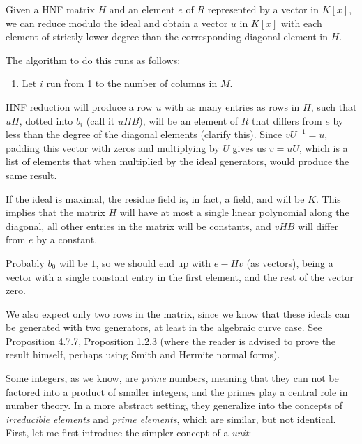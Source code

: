 Given a HNF matrix $H$ and an element $e$ of $R$ represented by a vector in $K[x]$, we can reduce modulo
the ideal and obtain a vector $u$ in $K[x]$ with each element of strictly lower degree than the
corresponding diagonal element in $H$.

The algorithm to do this runs as follows:
\begin{enumerate}
\item Let $i$ run from 1 to the number of columns in $M$.
\end{enumerate}


HNF reduction will produce a row $u$ with as many entries as
rows in $H$, such that $uH$, dotted into $b_i$ (call it $uHB$), will be an element of $R$ that differs
from $e$ by less than the degree of the diagonal elements (clarify this).
Since $vU^{-1} = u$, padding this vector with zeros
and multiplying by $U$ gives us $v = uU$, which is a list of elements that when multiplied by the
ideal generators, would produce the same result.

If the ideal is maximal, the residue field is, in fact, a field, and will be $K$.  This implies that the
matrix $H$ will have at most a single linear polynomial along the diagonal, all other entries in
the matrix will be constants, and $vHB$ will differ from $e$ by a constant.

Probably $b_0$ will be $1$, so we should end up with $e - Hv$ (as vectors), being a vector with a
single constant entry in the first element, and the rest of the vector zero.

We also expect only two rows in the matrix, since we know that these ideals can be generated with two generators,
at least in the algebraic curve case.  See \cite{cohen138} Proposition 4.7.7, \cite{cohen193} Proposition 1.2.3
(where the reader is advised to prove the result himself, perhaps using Smith and Hermite normal forms).

\vfill\eject


Some integers, as we know, are {\it prime} numbers, meaning that they
can not be factored into a product of smaller integers, and the primes
play a central role in number theory.  In a more abstract setting,
they generalize into the concepts of {\it irreducible elements} and
{\it prime elements}, which are similar, but not identical.
First, let me
first introduce the simpler concept of a {\it unit}:

